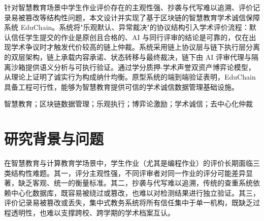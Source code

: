 \documentclass[10pt,twocolumn]{ctexart}
\begin{document}

\quad
针对智慧教育场景中学生作业评价存在的主观性强、抄袭与代写难以追溯、评价记录易被篡改等结构性问题，本文设计并实现了基于区块链的智慧教育学术诚信保障系统 EduChain。系统将"乐观默认、异常裁决"的协议结构引入学术评价流程：默认信任学生提交的作业是原创且合格的、AI 与同行评审的结论是可靠的，仅在出现学术争议时才触发代价较高的链上仲裁。系统采用链上协议层与链下执行层分离的双层架构，链上承载内容承诺、状态转移与最终裁决，链下由 AI 评审代理与隔离沙箱提供语义分析与可执行验证。通过学分质押-学术声誉双资产博弈论模型，从理论上证明了诚实行为构成纳什均衡。原型系统的端到端验证表明，EduChain 具备工程可行性，能够为智慧教育提供可信的学术诚信数据管理基础设施。

\vspace{0.6em}
\quad
智慧教育；区块链数据管理；乐观执行；博弈论激励；学术诚信；去中心化仲裁

\vspace{1.0em}

\section{研究背景与问题}

在智慧教育与计算教育学场景中，学生作业（尤其是编程作业）的评价长期面临三类结构性难题。其一，评分主观性强，不同评审者对同一作业的评分可能差异显著，缺乏客观、统一的衡量标准。其二，抄袭与代写难以追溯，传统的查重系统依赖中心化数据库，既容易被绕过或篡改，也难以对检测结果进行独立验证。其三，评价记录易被篡改或丢失，集中式教务系统将所有信任集中于单一机构，既缺乏过程透明性，也难以支撑跨校、跨学期的学术档案互认。
\end{document}
